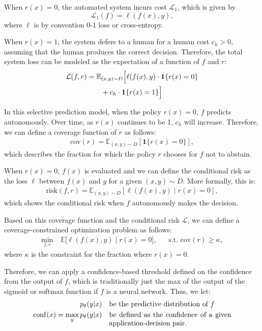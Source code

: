 \documentclass[conference]{IEEEtran}
\begin{document}
When $r(x) = 0$, the automated system incurs cost $\mathcal{L}_{1}$, which is given by
\[
\mathcal{L}_{1}(f) = \ell(f(x), y),
\]
where $\ell$ is by convention 0-1 loss or cross-entropy.

When $r(x) = 1$, the system defers to a human for a human cost $c_h > 0$,
assuming that the human produces the correct decision. Therefore, the total system loss can 
be modeled as the expectation of a function of $f$ and $r$:
\begin{align}
\mathcal{L}(f, r) 
    &= \mathbb{E}_{(x,y) \sim D} \Big[ 
        \ell(f(x),y) \cdot \mathbf{1}\{ r(x) = 0 \} \notag \\
    &\qquad + c_h \cdot \mathbf{1}\{ r(x) = 1 \} 
       \Big]
\end{align}

In this selective prediction model, when the policy $r(x) = 0$, $f$ predicts autonomously. 
Over time, as $r(x)$ continues to be 1, $c_h$ will increase. Therefore, we can define a coverage
function of $r$ as follows:
\begin{align}
\mathrm{cov}(r) = \mathbb{E}_{(x,y) \sim D}[\mathbf{1}\{r(x)=0\}],
\end{align}
which describes the fraction for which the policy $r$ chooses for $f$ not to abstain.

When $r(x) = 0$, $f(x)$ is evaluated and we can define the conditional risk as the loss $\ell$
between $f(x)$ and $y$ for a given $(x, y) \sim D$. More formally, this is:
\begin{align}
\mathrm{risk}(f, r) = \mathbb{E}_{(x,y) \sim D}[\ell(f(x), y) \mid r(x) = 0],
\end{align}
which shows the conditional risk when $f$ autonomously makes the decision.

Based on this coverage function and the conditional risk $\mathcal{L}$, we can define a 
coverage-constrained optimization problem as follows:
\begin{align}
\label{eq:minbinary}
\min_{f,r} \;& \mathbb{E} \big[ \ell(f(x),y) \mid r(x) = 0 \big], &&
\text{s.t. } \mathrm{cov}(r) \geq \kappa, 
\end{align}
where $\kappa$ is the constraint for the fraction where $r(x) = 0$.

Therefore, we can apply a confidence-based threshold defined on the confidence from the output of $f$, 
which is traditionally just the max of the output of the sigmoid or softmax function if $f$ is a 
neural network.
Thus, we let:
\begin{align}
p_\theta(y | x) && \parbox[t]{0.5\linewidth}{be the predictive distribution of $f$}\\
\mathrm{conf}(x) = \max_{y}p_\theta(y | x) && \parbox[t]{0.5\linewidth}{be defined as the 
                                                                        confidence of a given 
                                                                        application-decision pair.}
\end{align}
\end{document}
